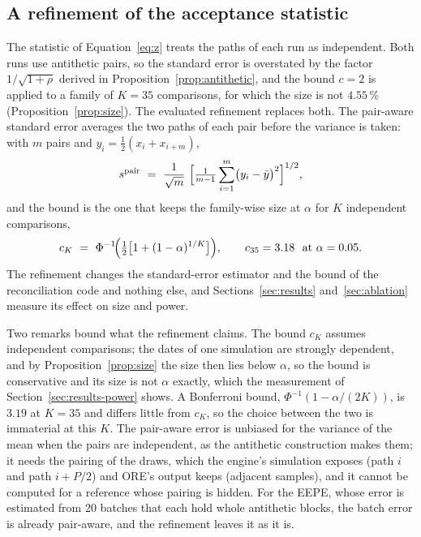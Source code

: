 \subsection{A refinement of the acceptance statistic}
\label{sec:proposed-refine}

The statistic of Equation~\eqref{eq:z} treats the paths of each run as independent. Both runs use antithetic pairs, so the standard error is overstated by the factor $1/\sqrt{1+\rho}$ derived in Proposition~\ref{prop:antithetic}, and the bound $c=2$ is applied to a family of $K=35$ comparisons, for which the size is not $4.55\,\%$ (Proposition~\ref{prop:size}). The evaluated refinement replaces both. The pair-aware standard error averages the two paths of each pair before the variance is taken: with $m$ pairs and $y_i=\tfrac12(x_i+x_{i+m})$,
\begin{equation}
s^{\mathrm{pair}}\ =\ \frac{1}{\sqrt{m}}\ \Bigl[\tfrac{1}{m-1}\sum_{i=1}^{m}\bigl(y_i-\bar{y}\bigr)^{2}\Bigr]^{1/2},
\label{eq:pair-se}
\end{equation}
and the bound is the one that keeps the family-wise size at $\alpha$ for $K$ independent comparisons,
\begin{equation}
c_K\ =\ \Phi^{-1}\!\Bigl(\tfrac12\bigl[1+(1-\alpha)^{1/K}\bigr]\Bigr),\qquad c_{35}=3.18\ \text{ at }\alpha=0.05 .
\label{eq:sidak}
\end{equation}
The refinement changes the standard-error estimator and the bound of the reconciliation code and nothing else, and Sections~\ref{sec:results} and~\ref{sec:ablation} measure its effect on size and power.

Two remarks bound what the refinement claims. The bound $c_K$ assumes independent comparisons; the dates of one simulation are strongly dependent, and by Proposition~\ref{prop:size} the size then lies below $\alpha$, so the bound is conservative and its size is not $\alpha$ exactly, which the measurement of Section~\ref{sec:results-power} shows. A Bonferroni bound, $\Phi^{-1}(1-\alpha/(2K))$, is $3.19$ at $K=35$ and differs little from $c_K$, so the choice between the two is immaterial at this $K$. The pair-aware error is unbiased for the variance of the mean when the pairs are independent, as the antithetic construction makes them; it needs the pairing of the draws, which the engine's simulation exposes (path $i$ and path $i+P/2$) and ORE's output keeps (adjacent samples), and it cannot be computed for a reference whose pairing is hidden. For the EEPE, whose error is estimated from 20 batches that each hold whole antithetic blocks, the batch error is already pair-aware, and the refinement leaves it as it is.

